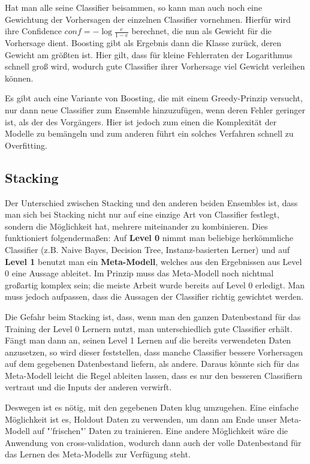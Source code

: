 Hat man alle seine Classifier beisammen, so kann man auch noch eine 
Gewichtung der Vorhersagen der einzelnen Classifier vornehmen. Hierfür
wird ihre Confidence \(conf = -\log \frac{e}{1-e}\) berechnet, die nun
als Gewicht für die Vorhersage dient. Boosting gibt als Ergebnis dann die Klasse
zurück, deren Gewicht am größten ist. Hier gilt, dass für kleine Fehlerraten der 
Logarithmus schnell groß wird, wodurch gute Classifier ihrer Vorhersage viel
Gewicht verleihen können.

Es gibt auch eine Variante von Boosting, die mit einem Greedy-Prinzip versucht,
nur dann neue Classifier zum Ensemble hinzuzufügen, wenn deren Fehler geringer
ist, als der des Vorgängers. Hier ist jedoch zum einen die Komplexität der Modelle
zu bemängeln und zum anderen führt ein solches Verfahren schnell zu Overfitting.

\subsection{Stacking}
Der Unterschied zwischen Stacking und den anderen beiden Ensembles ist,
dass man sich bei Stacking nicht nur auf eine einzige Art von Classifier festlegt,
sondern die Möglichkeit hat, mehrere miteinander zu kombinieren.
Dies funktioniert folgendermaßen: Auf \textbf{Level 0} nimmt man beliebige
herkömmliche Classifier (z.B. Naive Bayes, Decision Tree, Instanz-basierten Lerner)
und auf \textbf{Level 1} benutzt man ein \textbf{Meta-Modell}, welches aus
den Ergebnissen aus Level 0 eine Aussage ableitet. Im Prinzip muss das Meta-Modell
noch nichtmal großartig komplex sein; die meiste Arbeit wurde bereits auf 
Level 0 erledigt. Man muss jedoch aufpassen, dass die Aussagen der Classifier 
richtig gewichtet werden. 

Die Gefahr beim Stacking ist, dass, wenn man den ganzen Datenbestand für
das Training der Level 0 Lernern nutzt, man unterschiedlich gute Classifier erhält.
Fängt man dann an, seinen Level 1 Lernen auf die bereits verwendeten Daten
anzusetzen, so wird dieser feststellen, dass manche Classifier bessere Vorhersagen
auf dem gegebenen Datenbestand liefern, als andere. Daraus könnte sich für
das Meta-Modell leicht die Regel ableiten lassen, dass es nur den besseren 
Classifiern vertraut und die Inputs der anderen verwirft. 

Deswegen ist es nötig, mit den gegebenen Daten klug umzugehen. Eine einfache
Möglichkeit ist es, Holdout Daten zu verwenden, um dann am Ende unser Meta-Modell
auf "'frischen"' Daten zu trainieren. Eine andere Möglichkeit wäre die 
Anwendung von cross-validation, wodurch dann auch der volle Datenbestand
für das Lernen des Meta-Modells zur Verfügung steht.

